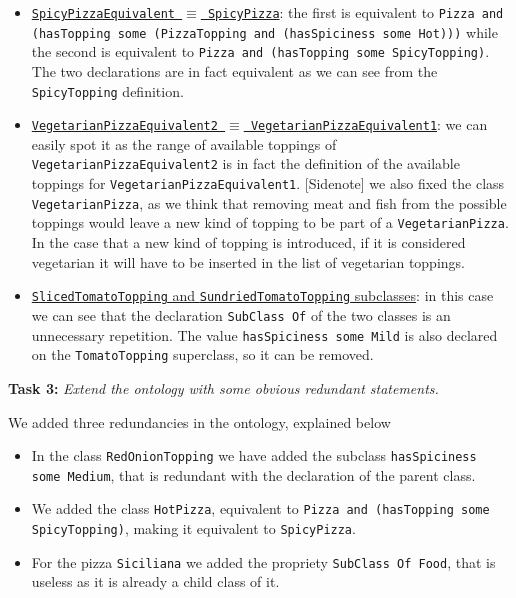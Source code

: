 \documentclass[12pt]{article}
\newcommand{\vrbsome}{{\color{magenta}some }}
\newcommand{\vrband}{{\color{cyan}and }}
\begin{document}
\begin{itemize}
\item{\underline{\texttt{SpicyPizzaEquivalent $\equiv$ SpicyPizza}}: the first is equivalent to \texttt{Pizza \vrband (hasTopping \vrbsome (PizzaTopping \vrband (hasSpiciness \vrbsome Hot)))} while the second is equivalent to \texttt{Pizza \vrband (hasTopping \vrbsome SpicyTopping)}. The two declarations are in fact equivalent as we can see from the \texttt{SpicyTopping} definition.}

\item{\underline{\texttt{VegetarianPizzaEquivalent2 $\equiv$ VegetarianPizzaEquivalent1}}: we can easily spot it as the range of available toppings of \texttt{VegetarianPizzaEquivalent2} is in fact the definition of the available toppings for \texttt{VegetarianPizzaEquivalent1}. [Sidenote] we also fixed the class \texttt{VegetarianPizza}, as we think that removing meat and fish from the possible toppings would leave a new kind of topping to be part of a \texttt{VegetarianPizza}. In the case that a new kind of topping is introduced, if it is considered vegetarian it will have to be inserted in the list of vegetarian toppings.}

\item{\underline{\texttt{SlicedTomatoTopping} and \texttt{SundriedTomatoTopping} subclasses}: in this case we can see that the declaration \texttt{SubClass Of} of the two classes is an unnecessary repetition. The value \texttt{hasSpiciness \vrbsome Mild} is also declared on the \texttt{TomatoTopping} superclass, so it can be removed.}
\end{itemize}

\textbf{Task 3:} \textit{Extend the ontology with some obvious redundant statements.}

We added three redundancies in the ontology, explained below

\begin{itemize}
\item{In the class \texttt{RedOnionTopping} we have added the subclass \texttt{hasSpiciness \vrbsome Medium}, that is redundant with the declaration of the parent class.}
\item{We added the class \texttt{HotPizza}, equivalent to \texttt{Pizza \vrband (hasTopping some SpicyTopping)}, making it equivalent to \texttt{SpicyPizza}.}
\item{For the pizza \texttt{Siciliana} we added the propriety \texttt{SubClass Of Food}, that is useless as it is already a child class of it.}
\end{itemize}
\end{document}
